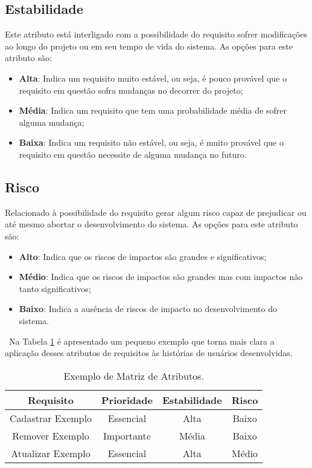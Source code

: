 		\subsection[Estabilidade]{Estabilidade}
			Este atributo está interligado com a possibilidade do requisito sofrer modificações ao longo do projeto ou em seu tempo de vida do sistema. As opções para este atributo são:
			\begin{itemize}
				\item{\textbf{Alta}: Indica um requisito muito estável, ou seja, é pouco provável que o requisito em questão sofra mudanças no decorrer do projeto;}
				\item{\textbf{Média}: Indica um requisito que tem uma probabilidade média de sofrer alguma mudança;}
				\item{\textbf{Baixa}: Indica um requisito não estável, ou seja, é muito provável que o requisito em questão necessite de alguma mudança no futuro.}
			\end{itemize}

		\subsection[Risco]{Risco}
			Relacionado à possibilidade do requisito gerar algum risco capaz de prejudicar ou até mesmo abortar o desenvolvimento do sistema. As opções para este atributo são:
			\begin{itemize}
				\item{\textbf{Alto}: Indica que os riscos de impactos são grandes e significativos;}
				\item{\textbf{Médio}: Indica que os riscos de impactos são grandes mas com impactos não tanto significativos;}
				\item{\textbf{Baixo}: Indica a ausência de riscos de impacto no desenvolvimento do sistema.}
			\end{itemize}
			\ \indent Na Tabela \ref{tab:atributos_requisitos} é apresentado um pequeno exemplo que torna mais clara a aplicação desses atributos de requisitos às histórias de usuários desenvolvidas.

			\begin{table}[h]
				\centering
				\begin{tabular}{|c|c|c|c|}
					\hline
					Requisito & Prioridade & Estabilidade & Risco \\ \hline
					Cadastrar Exemplo & Essencial & Alta & Baixo \\ \hline
					Remover Exemplo & Importante & Média & Baixo \\ \hline
					Atualizar Exemplo & Essencial & Alta & Médio \\
					\hline
				\end{tabular}
				\caption[Exemplo de Matriz de Atributos]{Exemplo de Matriz de Atributos.}
				\label{tab:atributos_requisitos}
			\end{table}